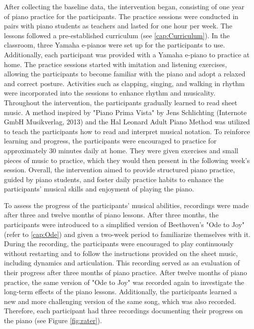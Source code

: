 
After collecting the baseline data, the intervention began, consisting of one year of piano practice for the participants. The practice sessions were conducted in pairs with piano students as teachers and lasted for one hour per week. The lessons followed a pre-established curriculum (see \ref{cap:Curriculum}).
In the classroom, three Yamaha e-pianos were set up for the participants to use. Additionally, each participant was provided with a Yamaha e-piano to practice at home.
The practice sessions started with imitation and listening exercises, allowing the participants to become familiar with the piano and adopt a relaxed and correct posture. Activities such as clapping, singing, and walking in rhythm were incorporated into the sessions to enhance rhythm and musicality.
Throughout the intervention, the participants gradually learned to read sheet music. A method inspired by  "Piano Prima Vista" by Jens Schlichting (Internote GmbH Musikverlag, 2013) and the Hal Leonard Adult Piano Method was utilized to teach the participants how to read and interpret musical notation.
To reinforce learning and progress, the participants were encouraged to practice for approximately 30 minutes daily at home. They were given exercises and small pieces of music to practice, which they would then present in the following week's session.
Overall, the intervention aimed to provide structured piano practice, guided by piano students, and foster daily practice habits to enhance the participants' musical skills and enjoyment of playing the piano.

To assess the progress of the participants' musical abilities, recordings were made after three and twelve months of piano lessons. After three months, the participants were introduced to a simplified version of Beethoven's "Ode to Joy" (refer to \ref{cap:Ode}) and given a two-week period to familiarize themselves with it. During the recording, the participants were encouraged to play continuously without restarting and to follow the instructions provided on the sheet music, including dynamics and articulation. This recording served as an evaluation of their progress after three months of piano practice.
After twelve months of piano practice, the same version of "Ode to Joy" was recorded again to investigate the long-term effects of the piano lessons. Additionally, the participants learned a new and more challenging version of the same song, which was also recorded. Therefore, each participant had three recordings documenting their progress on the piano (see Figure \ref{fig:rater}).


